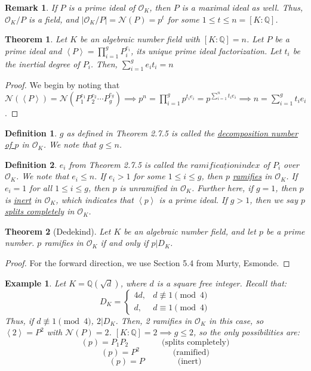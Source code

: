 \documentclass{article}
\newcommand{\la}{\left\langle}
\newcommand{\ra}{\right\rangle}
\newcommand{\air}{\mathcal{O}_K}
\newcommand{\Q}{\mathbb{Q}}
\newcommand{\N}{\mathcal{N}}
\newtheorem{theorem}{Theorem}[subsection]
\newtheorem{remark}{Remark}[subsection]
\newtheorem{example}{Example}[subsection]
\newtheorem{definition}{Definition}[subsection]
\begin{document}
\begin{remark}
If $P$ is a prime ideal of $\air$, then $P$ is a maximal ideal as well. Thus, $\air/P$ is a field, and $|\air/P|=\mathcal{N}(P)=p^t$ for some $1\leq t\leq n=[K:\Q]$.
\end{remark}
\newpage
\begin{theorem}
Let $K$ be an algebraic number field with $[K:\Q]=n$. Let $P$ be a prime ideal 
and $\la P\ra = \displaystyle\prod_{i=1}^g P_i^{e_i}$, its unique prime ideal factorization. 
Let $t_i$ be the inertial degree of $P_i$. Then, $\displaystyle\sum_{i=1}^g e_it_i = n$
\end{theorem}
\begin{proof}
We begin by noting that $\N(\la P\ra)=\N(P_1^{e_1}P_2^{e_2}\cdots P_g^{e_g})\implies p^n = \displaystyle\prod_{i=1}^g p^{t_ie_i}=p^{\sum_{i=1}^n t_ie_i}\implies n=\sum_{i=1}^g t_ie_i$.
\end{proof}
\begin{definition}
$g$ as defined in Theorem 2.7.5 is called the \underline{decomposition number of $p$} in $\air$. We note that $g\leq n$.
\end{definition}
\begin{definition}
$e_i$ from Theorem 2.7.5 is called the $\underline{ramification index}$ of $P_i$ over $\air$. We note that $e_i\leq n$. If $e_i>1$ for some $1\leq i\leq g$, then $p$ \underline{ramifies} in $\air$. If $e_i=1$ for all $1\leq i\leq g$, then $p$ is unramified in $\air$. Further here, if $g=1$, then $p$ is \underline{inert} in $\air$, which indicates that $\la p\ra$ is a prime ideal. If $g>1$, then we say $p$ \underline{splits completely} in $\air$.
\end{definition}
\begin{theorem}[Dedekind]
Let $K$ be an algebraic number field, and let $p$ be a prime number. $p$ ramifies in $\air$ if and only if $p|D_K$. 
\end{theorem}
\begin{proof}
For the forward direction, we use Section 5.4 from Murty, Esmonde.
\end{proof}
\begin{example}
Let $K=\Q(\sqrt{d})$, where $d$ is a square free integer. Recall that:
\begin{equation*}
    D_K=\begin{cases}
    4d, &d\not\equiv 1\pmod{4}\\
    d, &d\equiv 1\pmod{4}
    \end{cases}
\end{equation*}
Thus, if $d\not\equiv 1\pmod{4}$, $2|D_K$. Then, 2 ramifies in $\air$ in this case, so $\la 2\ra =P^2$ with $\N(P)=2$. $[K:\Q]=2\implies g\leq 2$, so the only possibilities are:
$$(p) = P_1P_2 \qquad\qquad\text{(splits completely)}$$
$$(p)=P^2\qquad\qquad\text{(ramified)}$$
$$(p)= P \qquad\qquad\text{(inert)}$$
\end{example}
\end{document}
